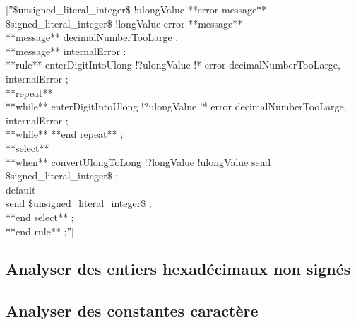 |''\$unsigned\_literal\_integer\$ !ulongValue **error message** %
\$signed\_literal\_integer\$ !longValue error **message** %
\\
**message** decimalNumberTooLarge : %
\\
**message** internalError : %
\\
**rule** %
 enterDigitIntoUlong !?ulongValue !* error decimalNumberTooLarge, internalError ;\\
 **repeat**\\
 **while** %
  enterDigitIntoUlong !?ulongValue !* error decimalNumberTooLarge, internalError ;\\
 **while** %
 **end repeat** ;\\
 **select**\\
 **when** %
  convertUlongToLong !?longValue !ulongValue %
  send \$signed\_literal\_integer\$ ;\\
 default\\
  send \$unsigned\_literal\_integer\$ ;\\
 **end select** ;\\
**end rule** ;''|

\subsection{Analyser des entiers hexadécimaux non signés}

\subsection{Analyser des constantes caractère}

